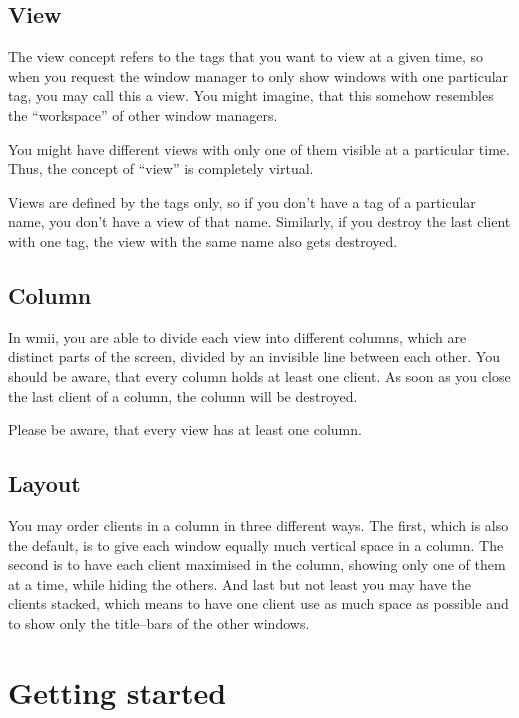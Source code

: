 \documentclass[12pt,a4paper]{article} %
\begin{document}
  \subsection{View}

    The view concept refers to the tags that you want to view at a
    given time, so when you request the window manager to only show
    windows with one particular tag, you may call this a view. You
    might imagine, that this somehow resembles the ``workspace'' of
    other window managers.

    You might have different views with only one of them visible at a
    particular time. Thus, the concept of ``view'' is completely
    virtual.

    Views are defined by the tags only, so if you don't have a tag of
    a particular name, you don't have a view of that name.  Similarly,
    if you destroy the last client with one tag, the view with the
    same name also gets destroyed.

  \subsection{Column}

    In wmii, you are able to divide each view into different columns,
    which are distinct parts of the screen, divided by an invisible
    line between each other. You should be aware, that every column
    holds at least one client. As soon as you close the last client of
    a column, the column will be destroyed.

    Please be aware, that every view has at least one column.

  \subsection{Layout}

    You may order clients in a column in three different ways. The
    first, which is also the default, is to give each window equally
    much vertical space in a column. The second is to have each client
    maximised in the column, showing only one of them at a time, while
    hiding the others. And last but not least you may have the clients
    stacked, which means to have one client use as much space as
    possible and to show only the title--bars of the other windows.

\section{Getting started}
\end{document}
